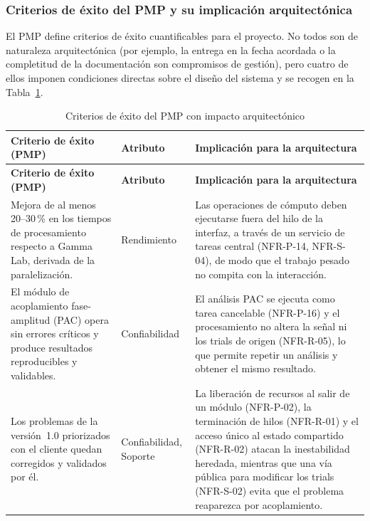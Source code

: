 \documentclass[11pt,a4paper]{article}
\DeclareRobustCommand{\_}{\textunderscore\allowbreak}
\begin{document}
\subsubsection{Criterios de éxito del PMP y su implicación arquitectónica}

El PMP define criterios de éxito cuantificables para el proyecto. No todos son de naturaleza arquitectónica (por ejemplo, la entrega en la fecha acordada o la completitud de la documentación son compromisos de gestión), pero cuatro de ellos imponen condiciones directas sobre el diseño del sistema y se recogen en la Tabla~\ref{tab:criterios_exito}.

\begin{longtable}{@{}>{\raggedright\arraybackslash}p{5.2cm}
                  >{\raggedright\arraybackslash}p{2.6cm}
                  >{\raggedright\arraybackslash}p{6.9cm}@{}}

\caption{Criterios de éxito del PMP con impacto arquitectónico} \label{tab:criterios_exito} \\
\toprule
\textbf{Criterio de éxito (PMP)} &
\textbf{Atributo} &
\textbf{Implicación para la arquitectura} \\
\midrule
\endfirsthead

\toprule
\textbf{Criterio de éxito (PMP)} &
\textbf{Atributo} &
\textbf{Implicación para la arquitectura} \\
\midrule
\endhead

\bottomrule
\endlastfoot

Mejora de al menos 20--30\,\% en los tiempos de procesamiento respecto a Gamma Lab, derivada de la paralelización.
&
Rendimiento
&
Las operaciones de cómputo deben ejecutarse fuera del hilo de la interfaz, a través de un servicio de tareas central (NFR-P-14, NFR-S-04), de modo que el trabajo pesado no compita con la interacción.
\\[0.2cm]

El módulo de acoplamiento fase-amplitud (PAC) opera sin errores críticos y produce resultados reproducibles y validables.
&
Confiabilidad
&
El análisis PAC se ejecuta como tarea cancelable (NFR-P-16) y el procesamiento no altera la señal ni los trials de origen (NFR-R-05), lo que permite repetir un análisis y obtener el mismo resultado.
\\[0.2cm]

Los problemas de la versión~1.0 priorizados con el cliente quedan corregidos y validados por él.
&
Confiabilidad, Soporte
&
La liberación de recursos al salir de un módulo (NFR-P-02), la terminación de hilos (NFR-R-01) y el acceso único al estado compartido (NFR-R-02) atacan la inestabilidad heredada, mientras que una vía pública para modificar los trials (NFR-S-02) evita que el problema reaparezca por acoplamiento.
\\[0.2cm]


\end{longtable}
\end{document}
